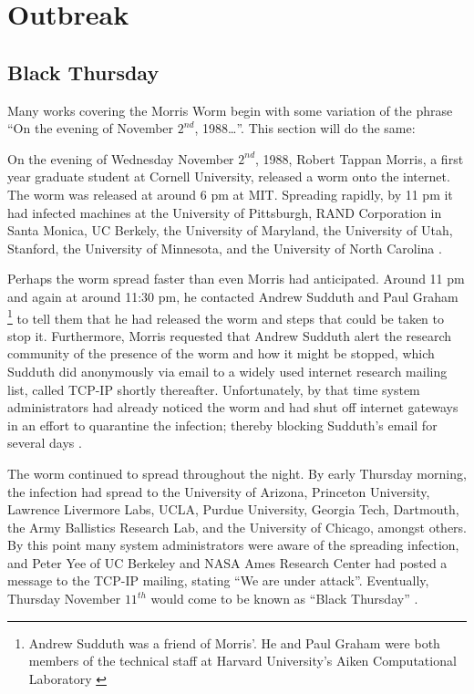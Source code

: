 \section*{Outbreak}

\subsection*{Black Thursday}

Many works covering the Morris Worm begin with some variation of the phrase
``On the evening of November $2^{nd}$, 1988\ldots''.
This section will do the same: 

On the evening of Wednesday November $2^{nd}$, 1988, Robert Tappan Morris, a
first year graduate student at Cornell University, released a worm onto the
internet. The worm was released at around 6 pm at MIT. Spreading rapidly, by 11
pm it had infected machines at
the University of Pittsburgh,
RAND Corporation in Santa Monica,
UC Berkely,
the University of Maryland,
the University of Utah,
Stanford,
the University of Minnesota,
and the University of North Carolina
\cite{seeley_tour_1989}
\cite{spafford_internet_1989-1}.

Perhaps the worm spread faster than even Morris had anticipated. Around
11 pm and again at around 11:30 pm, he contacted Andrew Sudduth and Paul Graham
\footnote{
Andrew Sudduth was a friend of Morris'. He and Paul Graham were both
members of the technical staff at Harvard University's Aiken Computational
Laboratory \cite{lee_washpost_2013}
}
to tell them that he had released the worm and steps that could be taken to stop
it. Furthermore, Morris requested that Andrew Sudduth alert the research
community of the presence of the worm and how it might be stopped, which
Sudduth did anonymously via email to a widely used internet research mailing
list, called TCP-IP shortly thereafter.
Unfortunately, by that time system administrators had already noticed the worm and had shut off
internet gateways in an effort to quarantine the infection; thereby blocking
Sudduth's email for several days
\cite{lee_washpost_2013}\cite{eisenberg_cornell_1989}.

The worm continued to spread throughout the night. By early Thursday morning,
the infection had spread to the University of Arizona, Princeton University,
Lawrence Livermore Labs, UCLA, Purdue University, Georgia Tech, Dartmouth,
the Army Ballistics Research Lab, and the University of Chicago, amongst others.
By this point many system administrators were aware of the spreading infection, and Peter Yee of UC Berkeley and NASA
Ames Research Center had posted a message to the TCP-IP mailing, stating ``We
are under attack''. Eventually, Thursday November $11^{th}$ would come to be
known as ``Black Thursday''
\cite{seeley_tour_1989}
\cite{spafford_internet_1989-1}. 

